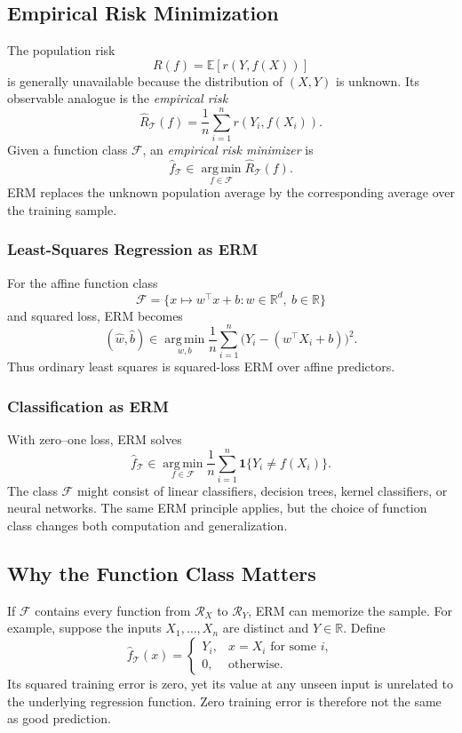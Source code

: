 \documentclass[12pt,oneside]{book}
\numberwithin{equation}{section}
\theoremstyle{definition}
\theoremstyle{plain}
\theoremstyle{remark}
\newcommand{\R}{\mathbb{R}}
\newcommand{\E}{\mathbb{E}}
\newcommand{\argmin}{\operatorname*{arg\,min}}
\begin{document}
\subsection{Empirical Risk Minimization}
The population risk
\[
R(f)=\E[r(Y,f(X))]
\]
is generally unavailable because the distribution of $(X,Y)$ is unknown. Its
observable analogue is the \emph{empirical risk}
\[
\widehat R_{\mathcal{T}}(f)
=\frac1n\sum_{i=1}^n r(Y_i,f(X_i)).
\]
Given a function class $\mathcal{F}$, an \emph{empirical risk minimizer} is
\[
\widehat f_{\mathcal{T}}
\in\argmin_{f\in\mathcal{F}}\widehat R_{\mathcal{T}}(f).
\]
ERM replaces the unknown population average by the corresponding average over
the training sample.

\subsubsection{Least-Squares Regression as ERM}
For the affine function class
\[
\mathcal{F}=\{x\mapsto w^\top x+b:w\in\R^d,\ b\in\R\}
\]
and squared loss, ERM becomes
\[
(\widehat w,\widehat b)
\in\argmin_{w,b}\frac1n\sum_{i=1}^n
\bigl(Y_i-(w^\top X_i+b)\bigr)^2.
\]
Thus ordinary least squares is squared-loss ERM over affine predictors.

\subsubsection{Classification as ERM}
With zero--one loss, ERM solves
\[
\widehat f_{\mathcal{T}}
\in\argmin_{f\in\mathcal{F}}
\frac1n\sum_{i=1}^n\mathbf{1}\{Y_i\neq f(X_i)\}.
\]
The class $\mathcal{F}$ might consist of linear classifiers, decision trees,
kernel classifiers, or neural networks. The same ERM principle applies, but
the choice of function class changes both computation and generalization.

\subsection{Why the Function Class Matters}
If $\mathcal{F}$ contains every function from $\mathcal{R}_X$ to
$\mathcal{R}_Y$, ERM can memorize the sample. For example, suppose the inputs
$X_1,\ldots,X_n$ are distinct and $Y\in\R$. Define
\[
\widehat f_{\mathcal{T}}(x)=
\begin{cases}
Y_i, & x=X_i\text{ for some }i,\\
0, & \text{otherwise}.
\end{cases}
\]
Its squared training error is zero, yet its value at any unseen input is
unrelated to the underlying regression function. Zero training error is
therefore not the same as good prediction.
\end{document}
